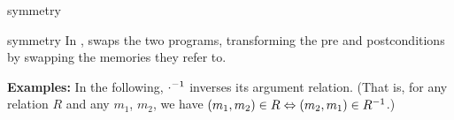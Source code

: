 \begin{tactic}{symmetry}
  \begin{tsyntax}{symmetry}
  In \prhl, swaps the two programs, transforming the pre and
  postconditions by swapping the memories they refer to.

  \textbf{Examples:} In the following, $\cdot^{-1}$ inverses its
  argument relation. (That is, for any relation $R$ and any $m_1$,
  $m_2$, we have
  $(m_1,m_2)\in{R}\Leftrightarrow(m_2,m_1)\in R^{-1}$.)
  \begin{mathpar}
    {}%
    \quad{}
  \end{mathpar}
  \end{tsyntax}
\end{tactic}

